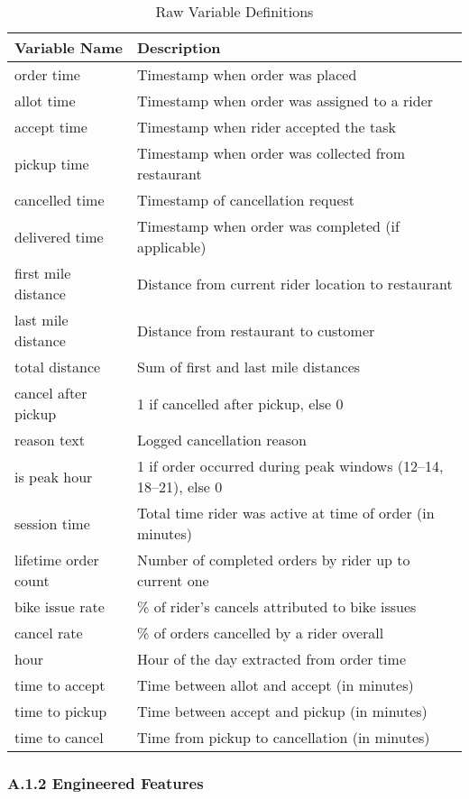 \begin{table}[H]
\centering
\caption{Raw Variable Definitions}
\label{tab:raw_vars}
\begin{tabular}{p{4cm} p{10cm}}
\toprule
\textbf{Variable Name} & \textbf{Description} \\
\midrule
order time & Timestamp when order was placed \\
allot time & Timestamp when order was assigned to a rider \\
accept time & Timestamp when rider accepted the task \\
pickup time & Timestamp when order was collected from restaurant \\
cancelled time & Timestamp of cancellation request \\
delivered time & Timestamp when order was completed (if applicable) \\
first mile distance & Distance from current rider location to restaurant \\
last mile distance & Distance from restaurant to customer \\
total distance & Sum of first and last mile distances \\
cancel after pickup & 1 if cancelled after pickup, else 0 \\
reason text & Logged cancellation reason \\
is peak hour & 1 if order occurred during peak windows (12--14, 18--21), else 0 \\
session time & Total time rider was active at time of order (in minutes) \\
lifetime order count & Number of completed orders by rider up to current one \\
bike issue rate & \% of rider's cancels attributed to bike issues \\
cancel rate & \% of orders cancelled by a rider overall \\
hour & Hour of the day extracted from order time \\
time to accept & Time between allot and accept (in minutes) \\
time to pickup & Time between accept and pickup (in minutes) \\
time to cancel & Time from pickup to cancellation (in minutes) \\
\bottomrule
\end{tabular}
\end{table}

\subsubsection*{A.1.2 Engineered Features}

